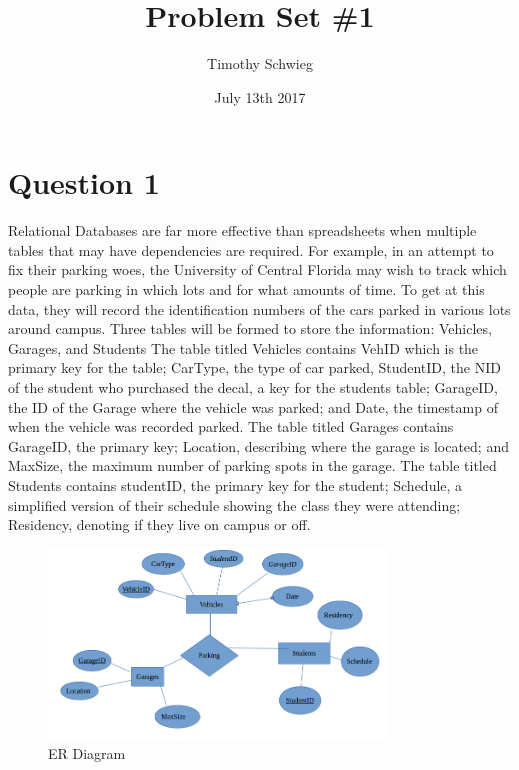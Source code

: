 \documentclass[10pt, letterpaper]{paper}
\title{ Problem Set \#1 }
\author{ Timothy Schwieg }
\date { July 13th 2017 }
\begin{document}
\maketitle

\section*{Question 1}
Relational Databases are far more effective than spreadsheets when multiple tables that may have dependencies are required. 
For example, in an attempt to fix their parking woes, the University of Central Florida may wish to track which people are parking in which lots and for what amounts of time.
To get at this data, they will record the identification numbers of the cars parked in various lots around campus. Three tables will be formed to store the information: Vehicles, Garages, and Students
\newline \newline
The table titled Vehicles contains VehID which is the primary key for the table; CarType, the type of car parked, StudentID, the NID of the student who purchased the decal, a key for the students table; GarageID, the ID of the Garage where the vehicle was parked; and Date, the timestamp of when the vehicle was recorded parked.
\newline 
The table titled Garages contains GarageID, the primary key; Location, describing where the garage is located; and MaxSize, the maximum number of parking spots in the garage.
\newline
The table titled Students contains studentID, the primary key for the student; Schedule, a simplified version of their schedule showing the class they were attending; Residency, denoting if they live on campus or off. 

\begin{figure}[h!]
\centering
\includegraphics[width=0.8\textwidth]{ERDiagram.png}
\caption{ ER Diagram }
\end{figure}
\end{document}
